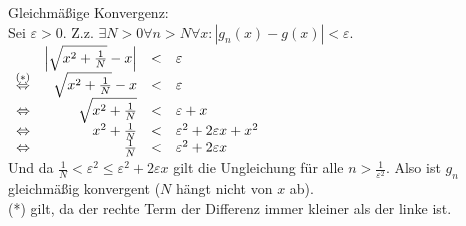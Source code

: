 \documentclass[11pt,a4paper,ngerman]{article}
\begin{document}
\begin{enumerate}[(i)]
        Gleichmäßige Konvergenz: \\
        Sei $\varepsilon > 0$. Z.z. $\exists N > 0\forall n>N\forall x: |g_n(x) - g(x)|<\varepsilon$. \\
        $\begin{array}[h!]{rrcl}
          &\left|\sqrt{x^2+ \frac{1}{N}} - x \right| &<& \varepsilon \\
          \stackrel{(*)}{\Leftrightarrow} &\sqrt{x^2+ \frac{1}{N}} - x  &<& \varepsilon \\
          \Leftrightarrow &\sqrt{x^2+ \frac{1}{N}}  &<& \varepsilon+x \\
          \Leftrightarrow &x^2+ \frac{1}{N}  &<& \varepsilon^2+2\varepsilon x + x^2 \\
          \Leftrightarrow &\frac{1}{N}  &<& \varepsilon^2+2\varepsilon x \\
        \end{array}$
        \\
        Und da $\frac{1}{N}  < \varepsilon^2 \leq \varepsilon^2+2\varepsilon x$ gilt die Ungleichung für alle $n > \frac{1}{\varepsilon^2}$. Also ist $g_n$ gleichmäßig konvergent ($N$ hängt nicht von $x$ ab). \\

    (*) gilt, da der rechte Term der Differenz immer kleiner als der linke ist.


\end{enumerate}
\end{document}
